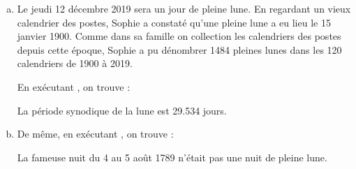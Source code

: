 \begin{enumerate}[(a)]

  \item
        Le jeudi 12 décembre 2019 sera un jour de pleine lune. En regardant un vieux calendrier des postes, Sophie a
        constaté qu'une pleine lune a eu lieu le 15 janvier 1900. Comme dans sa famille on collection les calendriers
        des postes depuis cette époque, Sophie a pu dénombrer 1484 pleines lunes dans les 120 calendriers de 1900 à 2019.


        \bigskip

        En exécutant , on trouve :
        \begin{result}
          La période synodique de la lune est 29.534 jours.
        \end{result}

  \item


        \bigskip

        De même, en exécutant , on trouve  :
        \begin{result}
          La fameuse nuit du 4 au 5 août 1789 n'était pas une nuit de pleine lune.
        \end{result}
\end{enumerate}



